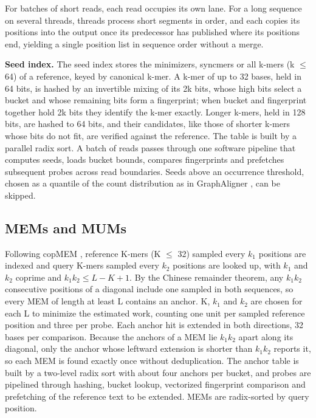 For batches of short reads, each read occupies its own lane. For a long sequence on several threads, threads process short segments in order, and each copies its positions into the output once its predecessor has published where its positions end, yielding a single position list in sequence order without a merge.

\textbf{Seed index.} The seed index stores the minimizers, syncmers or all k-mers (k $\le$ 64) of a reference, keyed by canonical k-mer. A k-mer of up to 32 bases, held in 64 bits, is hashed by an invertible mixing of its 2k bits, whose high bits select a bucket and whose remaining bits form a fingerprint; when bucket and fingerprint together hold 2k bits they identify the k-mer exactly. Longer k-mers, held in 128 bits, are hashed to 64 bits, and their candidates, like those of shorter k-mers whose bits do not fit, are verified against the reference. The table is built by a parallel radix sort. A batch of reads passes through one software pipeline that computes seeds, loads bucket bounds, compares fingerprints and prefetches subsequent probes across read boundaries. Seeds above an occurrence threshold, chosen as a quantile of the count distribution as in GraphAligner \citep{Rautiainen2020}, can be skipped.

\subsection{MEMs and MUMs}

Following copMEM \citep{Grabowski2019}, reference K-mers (K $\le$ 32) sampled every \(k_1\) positions are indexed and query K-mers sampled every \(k_2\) positions are looked up, with \(k_1\) and \(k_2\) coprime and \(k_1 k_2 \le L - K + 1\). By the Chinese remainder theorem, any \(k_1 k_2\) consecutive positions of a diagonal include one sampled in both sequences, so every MEM of length at least L contains an anchor. K, \(k_1\) and \(k_2\) are chosen for each L to minimize the estimated work, counting one unit per sampled reference position and three per probe. Each anchor hit is extended in both directions, 32 bases per comparison. Because the anchors of a MEM lie \(k_1 k_2\) apart along its diagonal, only the anchor whose leftward extension is shorter than \(k_1 k_2\) reports it, so each MEM is found exactly once without deduplication. The anchor table is built by a two-level radix sort with about four anchors per bucket, and probes are pipelined through hashing, bucket lookup, vectorized fingerprint comparison and prefetching of the reference text to be extended. MEMs are radix-sorted by query position.

